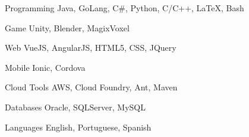 

\begin{cvskills}

  \cvskill
    {Programming} %
    {Java, GoLang, C\#, Python, C/C++, LaTeX, Bash} %

  \cvskill
    {Game} %
    {Unity, Blender, MagixVoxel} %

  \cvskill
    {Web} %
    {VueJS, AngularJS, HTML5, CSS, JQuery} %

  \cvskill
    {Mobile} %
    {Ionic, Cordova} %
    
  \cvskill
    {Cloud Tools} %
    {AWS, Cloud Foundry, Ant, Maven} %

  \cvskill
    {Databases} %
    {Oracle, SQLServer, MySQL} %
        
  \cvskill
    {Languages} %
    {English, Portuguese, Spanish} %
    

\end{cvskills}
